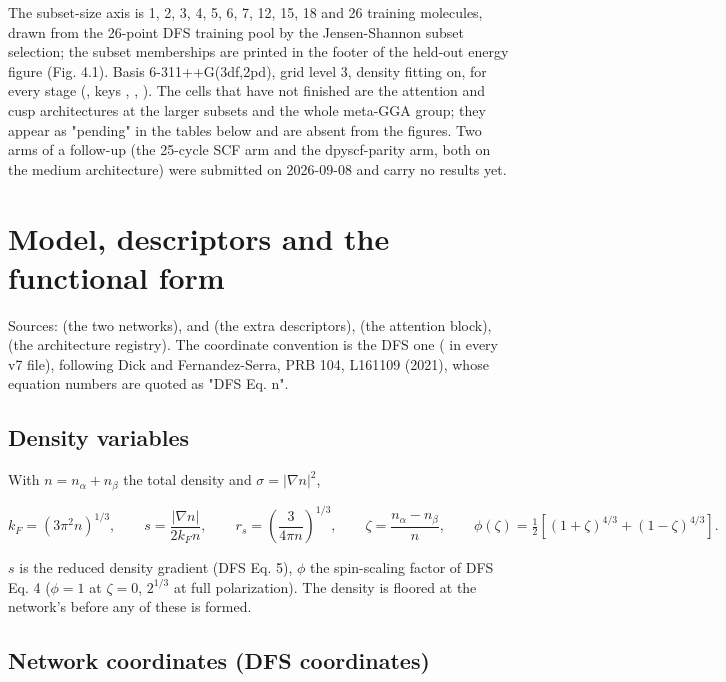 \documentclass[10pt,a4paper]{article}
\begin{document}
The subset-size axis is 1, 2, 3, 4, 5, 6, 7, 12, 15, 18 and 26 training molecules, drawn from
the 26-point DFS training pool by the Jensen-Shannon subset selection; the subset memberships are
printed in the footer of the held-out energy figure (Fig. 4.1). Basis 6-311++G(3df,2pd), grid
level 3, density fitting on, for every stage (, keys ,
, ). The cells that have not finished are the attention and cusp
architectures at the larger subsets and the whole meta-GGA group; they appear as "pending" in
the tables below and are absent from the figures. Two arms of a follow-up (the 25-cycle SCF arm
and the dpyscf-parity arm, both on the medium architecture) were submitted on 2026-09-08 and
carry no results yet.


\section{Model, descriptors and the functional form}

Sources:  (the two networks),  and
 (the extra descriptors),  (the attention block),
 (the architecture registry). The coordinate convention is the DFS one
( in every v7 file), following Dick and Fernandez-Serra,
PRB 104, L161109 (2021), whose equation numbers are quoted as "DFS Eq. n".

\subsection{Density variables}

With $n = n_\alpha + n_\beta$ the total density and $\sigma = |\nabla n|^2$,

\[
k_F = (3\pi^2 n)^{1/3}, \qquad
s = \frac{|\nabla n|}{2 k_F n}, \qquad
r_s = \left(\frac{3}{4\pi n}\right)^{1/3}, \qquad
\zeta = \frac{n_\alpha - n_\beta}{n}, \qquad
\phi(\zeta) = \tfrac12\left[(1+\zeta)^{4/3} + (1-\zeta)^{4/3}\right].
\]

$s$ is the reduced density gradient (DFS Eq. 5), $\phi$ the spin-scaling factor of DFS Eq. 4
($\phi = 1$ at $\zeta = 0$, $2^{1/3}$ at full polarization). The density is floored at the
network's  before any of these is formed.

\subsection{Network coordinates (DFS coordinates)}
\end{document}
